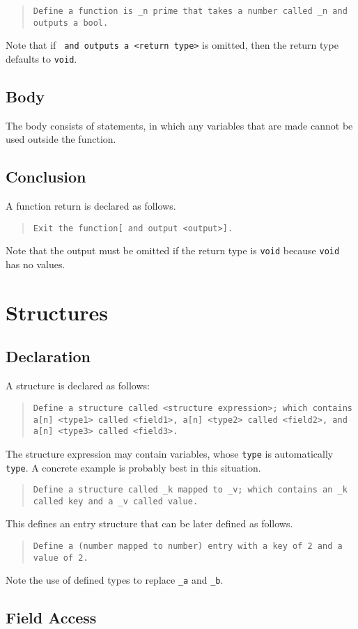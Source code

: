 \documentclass{article}
\newcommand{\code}[1]{\texttt{#1}}
\newcommand{\codeblock}[1]{\begin{quote}\code{#1}\end{quote}}
\begin{document}
\codeblock{Define a function is \_{}n prime that takes a number called \_{}n and outputs a bool.}

Note that if \code{ and outputs a <return type>} is omitted, then the return type defaults to \code{void}.

\subsection{Body}
The body consists of statements, in which any variables that are made cannot be used outside the function.
\subsection{Conclusion}
A function return is declared as follows.

\codeblock{Exit the function[ and output <output>].}

Note that the output must be omitted if the return type is \code{void} because \code{void} has no values.

\section{Structures}
\subsection{Declaration}
A structure is declared as follows:

\codeblock{Define a structure called <structure expression>; which contains a[n] <type1> called <field1>, a[n] <type2> called <field2>, and a[n] <type3> called <field3>.}

The structure expression may contain variables, whose \code{type} is automatically \code{type}. A concrete example is probably best in this situation.

\codeblock{Define a structure called \_{}k mapped to \_{}v; which contains an \_{k} called key and a \_{v} called value.}

This defines an entry structure that can be later defined as follows.

\codeblock{Define a (number mapped to number) entry with a key of 2 and a value of 2.}

Note the use of defined types to replace \code{\_{a}} and \code{\_{b}}.

\subsection{Field Access}
\end{document}
